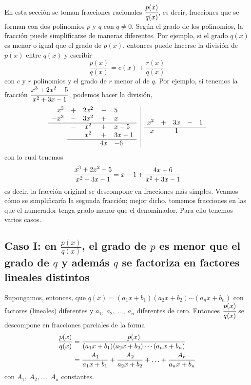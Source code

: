 En esta sección se toman fracciones racionales {\footnotesize $\cfrac{p(x)}{q(x)}$,} es decir, fracciones que se forman con dos polinomios $p$ y $q$ con $q\ne0$. Según el grado de los polinomios, la fracción puede simplificarse de maneras diferentes. Por ejemplo, si el grado $q(x)$ es menor o igual que el grado de $p(x)$, entonces puede hacerse la división de $p(x)$ entre $q(x)$ y escribir
\[
\frac{p(x)}{q(x)}=c(x)+\frac{r(x)}{q(x)}
\]
con $c$ y $r$ polinomios y el grado de $r$ menor al de $q$. Por ejemplo, si tenemos la fracción $\cfrac{x^3+2x^2-5}{x^2+3x-1}$, podemos hacer la división,
\def\arraystretch{1.5}
\[
\begin{array}{c|c} %
	\begin{array}{rcccl} %
		x^3 & + & 2x^2 & - & 5 \\
		-x^3 & - & 3x^2 & + & x \\
		\cline{1-5}
		& - & x^2 & + & x-5 \\
		& & x^2 & + & 3x-1 \\
		\cline{2-5}
		& & & 4x & -6 \\
	\end{array}
	&
	\begin{array}{rcccl} %
		x^2 & + & 3x & - & 1 \\
		\cline{1-5}
		x & - & 1 & &
	\end{array}
\end{array}
\]
con lo cual tenemos
\[
\cfrac{x^3+2x^2-5}{x^2+3x-1}=x-1+\frac{4x-6}{x^2+3x-1}
\]
es decir, la fracción original se descompone en fracciones más simples. Veamos cómo se simplificaría la segunda fracción; mejor dicho, tomemos fracciones en las que el numerador tenga grado menor que el denominador. Para ello tenemos varios casos.

\subsection*{Caso I: en $\frac{p(x)}{q(x)}$, el grado de $p$ es menor que el grado de $q$ y además $q$ se factoriza en factores lineales distintos}

Supongamos, entonces, que $q(x)=(a_1x+b_1)(a_2x+b_2)\cdots(a_nx+b_n)$ con factores (lineales) diferentes y $a_1,\ a_2,\ \ldots,\ a_n$ diferentes de cero. Entonces {\scriptsize $\cfrac{p(x)}{q(x)}$} se descompone en fracciones parciales de la forma
\begin{align}\label{FraccLinDif}
\frac{p(x)}{q(x)}&=\frac{p(x)}{(a_1x+b_1)(a_2x+b_2)\cdots(a_nx+b_n)}\notag\\
&=\frac{A_1}{a_1x+b_1}+\frac{A_2}{a_2x+b_2}+\ldots+\frac{A_n}{a_nx+b_n}
\end{align}
con $A_1,\ A_2,\ldots,\ A_n$ constantes.

